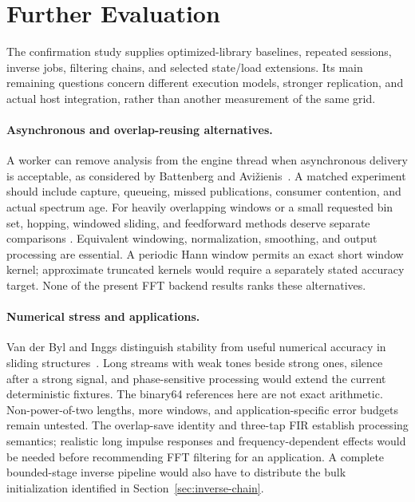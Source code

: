 \section{Further Evaluation}
\label{app:evaluation-agenda}
The confirmation study supplies optimized-library baselines, repeated sessions,
inverse jobs, filtering chains, and selected state/load extensions. Its main
remaining questions concern different execution models, stronger replication,
and actual host integration, rather than another measurement of the same grid.

\paragraph{Asynchronous and overlap-reusing alternatives.}
A worker can remove analysis from the engine thread when asynchronous delivery
is acceptable, as considered by Battenberg and
Avi\v{z}ienis~\cite{battenberg2011}. A matched experiment should include capture,
queueing, missed publications, consumer contention, and actual spectrum age.
For heavily overlapping windows or a small requested bin set, hopping,
windowed sliding, and feedforward methods deserve separate comparisons
\cite{garrido2016,park2014,rafii2018,eleftheriadis2023}. Equivalent windowing,
normalization, smoothing, and output processing are essential. A periodic Hann
window permits an exact short window kernel; approximate truncated kernels
would require a separately stated accuracy target. None of the present FFT
backend results ranks these alternatives.

\paragraph{Numerical stress and applications.}
Van der Byl and Inggs distinguish stability from useful numerical accuracy in
sliding structures~\cite{vanderbyl2016}. Long streams with weak tones beside
strong ones, silence after a strong signal, and phase-sensitive processing
would extend the current deterministic fixtures. The binary64 references here
are not exact arithmetic. Non-power-of-two lengths, more windows, and
application-specific error budgets remain untested. The overlap-save identity
and three-tap FIR establish processing semantics; realistic long impulse
responses and frequency-dependent effects would be needed before recommending
FFT filtering for an application. A complete bounded-stage inverse pipeline
would also have to distribute the bulk initialization identified in
Section~\ref{sec:inverse-chain}.

